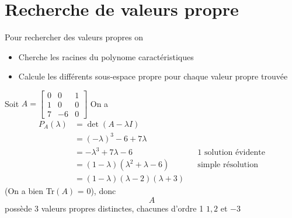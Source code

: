 \documentclass[11pt,colorlinks]{book}
\theoremstyle{mytheoremstyle}
\theoremstyle{mytheoremstyle}
\theoremstyle{mytheoremstyle}
\theoremstyle{mytheoremstyle}
\theoremstyle{mytheoremstyle}
\theoremstyle{mytheoremstyle}
\theoremstyle{mytheoremstyle}
\theoremstyle{mytheoremstyle}
\theoremstyle{myproblemstyle}
\begin{document}
\section{Recherche de valeurs propre}
\begin{definition}[Méthode]
  Pour rechercher des valeurs propres on 
  \begin{itemize}
    \item Cherche les racines du polynome caractéristiques 
    \item Calcule les différents sous-espace propre pour chaque valeur propre trouvée
  \end{itemize}
\end{definition}
\begin{ex}
  Soit $A = \begin{bmatrix}
    0 & 0 & 1 \\ 
    1 & 0 & 0 \\ 
    7 & -6 & 0
  \end{bmatrix}$
  On a 
  \begin{align*}
    P_A(\lambda) &= \det (A - \lambda I) \\ 
    &= (-\lambda)^3 - 6 + 7\lambda \\ 
    &= -\lambda^3 + 7\lambda - 6 && \text{1 solution évidente} \\ 
    &= (1 - \lambda)(\lambda^2+\lambda-6) && \text{simple résolution} \\ 
    &= (1 - \lambda)(\lambda - 2)(\lambda + 3)
  \end{align*}
  (On a bien Tr$(A)$ = 0), donc 
  \begin{equation*}
    A
  \end{equation*}
  possède 3 valeurs propres distinctes, chacunes d'ordre 1 $1, 2$ et $-3$

\end{ex}
\end{document}
